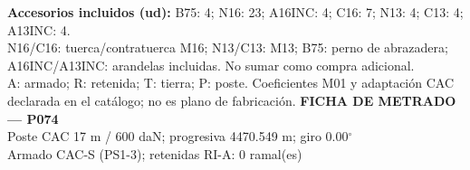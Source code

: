 \begingroup\scriptsize
\textbf{Accesorios incluidos (ud):} B75: 4; N16: 23; A16INC: 4; C16: 7; N13: 4; C13: 4; A13INC: 4.\\
N16/C16: tuerca/contratuerca M16; N13/C13: M13; B75: perno de abrazadera; A16INC/A13INC: arandelas incluidas. No sumar como compra adicional.\\
A: armado; R: retenida; T: tierra; P: poste. Coeficientes M01 y adaptación CAC declarada en el catálogo; no es plano de fabricación.
\endgroup\endgroup
\clearpage{}
\begingroup\small\setlength{\parskip}{3pt}\renewcommand{\arraystretch}{1.05}
\textbf{\large FICHA DE METRADO — P074}\\[4pt]
Poste CAC 17 m / 600 daN; progresiva 4470.549 m; giro 0.00\ensuremath{^\circ}\\
Armado CAC-S (PS1-3); retenidas RI-A: 0 ramal(es)\\
\begingroup\scriptsize
